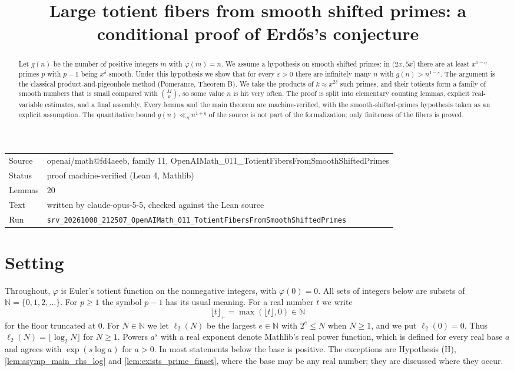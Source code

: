\documentclass[11pt]{article}
\title{Large totient fibers from smooth shifted primes: a conditional proof of Erd\H{o}s's conjecture}
\date{}
\theoremstyle{definition}
\theoremstyle{remark}
\newcommand{\floorp}[1]{\lfloor #1\rfloor_{+}}
\newcommand{\ltwo}{\ell_{2}}
\begin{document}
\maketitle
\begin{abstract}
Let $g(n)$ be the number of positive integers $m$ with $\varphi(m)=n$. We assume a hypothesis on smooth shifted primes: in $(2x,5x]$ there are at least $x^{1-\eta}$ primes $p$ with $p-1$ being $x^{\delta}$-smooth. Under this hypothesis we show that for every $\varepsilon>0$ there are infinitely many $n$ with $g(n)>n^{1-\varepsilon}$. The argument is the classical product-and-pigeonhole method (Pomerance, Theorem B). We take the products of $k\approx x^{2\delta}$ such primes, and their totients form a family of smooth numbers that is small compared with $\binom{M}{k}$, so some value $n$ is hit very often. The proof is split into elementary counting lemmas, explicit real-variable estimates, and a final assembly. Every lemma and the main theorem are machine-verified, with the smooth-shifted-primes hypothesis taken as an explicit assumption. The quantitative bound $g(n)\ll_\eta n^{1+\eta}$ of the source is not part of the formalization; only finiteness of the fibers is proved.
\end{abstract}

\begin{center}\small
\begin{tabular}{@{}ll@{}}
\toprule
Source & openai/math@fd4aeeb, family 11, OpenAIMath\_011\_TotientFibersFromSmoothShiftedPrimes \\
Status & proof machine-verified (Lean 4, Mathlib) \\
Lemmas & 20 \\
Text & written by claude-opus-5-5, checked against the Lean source \\
Run & \texttt{srv\_20261008\_212507\_OpenAIMath\_011\_TotientFibersFromSmoothShiftedPrimes} \\
\bottomrule
\end{tabular}
\end{center}

\tableofcontents

\section{Setting}

Throughout, $\varphi$ is Euler's totient function on the nonnegative integers, with $\varphi(0)=0$. All sets of integers below are subsets of $\mathbb{N}=\{0,1,2,\dots\}$. For $p\ge1$ the symbol $p-1$ has its usual meaning. For a real number $t$ we write
\[
\floorp{t}=\max(\lfloor t\rfloor,0)\in\mathbb{N}
\]
for the floor truncated at $0$. For $N\in\mathbb{N}$ we let $\ltwo(N)$ be the largest $e\in\mathbb{N}$ with $2^e\le N$ when $N\ge1$, and we put $\ltwo(0)=0$. Thus $\ltwo(N)=\lfloor\log_2 N\rfloor$ for $N\ge1$. Powers $a^{s}$ with a real exponent denote Mathlib's real power function, which is defined for every real base $a$ and agrees with $\exp(s\log a)$ for $a>0$. In most statements below the base is positive. The exceptions are Hypothesis (H), \cref{lem:asymp_main_rhs_log} and \cref{lem:exists_prime_finset}, where the base may be any real number; they are discussed where they occur.
\end{document}
